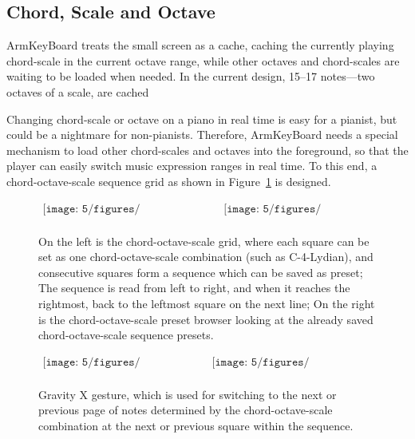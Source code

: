 \subsection{Chord, Scale and Octave}
ArmKeyBoard treats the small screen as a cache, caching the currently playing chord-scale in the current octave range, while other
octaves and chord-scales are waiting to be loaded when needed. In the current design, 15--17 notes---two octaves of a scale, are cached

Changing chord-scale or octave on a piano in real time is easy for a pianist, but could be a nightmare for non-pianists. Therefore, ArmKeyBoard needs a special mechanism to load other chord-scales and octaves into the foreground, so that the player can easily switch music expression ranges in real time. To this end, a chord-octave-scale sequence grid as shown in Figure~\ref{fig:5-cosgrid} is designed.
\begin{figure}[htbp]
\begin{center}$
\begin{array}{cc}
    \texttt{[image: 5/figures/ChordOctaveScaleGrid.PNG]} &
    \texttt{[image: 5/figures/ChordScalePreset.PNG]}\\
\end{array}$
\end{center}
\caption{On the left is the chord-octave-scale grid, where each square can be set as one chord-octave-scale
combination (such as C-4-Lydian), and consecutive squares form a sequence which can be saved as preset; The sequence is read from left to right, and when it reaches the rightmost, back to the leftmost square on the next line; On the right is the chord-octave-scale preset browser looking at the already saved chord-octave-scale sequence presets.}
\label{fig:5-cosgrid}
\end{figure}

\begin{figure}[htbp]
\begin{center}$
\begin{array}{cc}
\texttt{[image: 5/figures/Gravity0.jpg]} &
\texttt{[image: 5/figures/GravityX.jpg]} \\
\end{array}$
\end{center}
\caption{Gravity X gesture, which is used for switching to the next or previous page of notes determined by the chord-octave-scale combination at the next or previous square within the sequence.}
\label{fig:5-GravityXGesture}
\end{figure}

